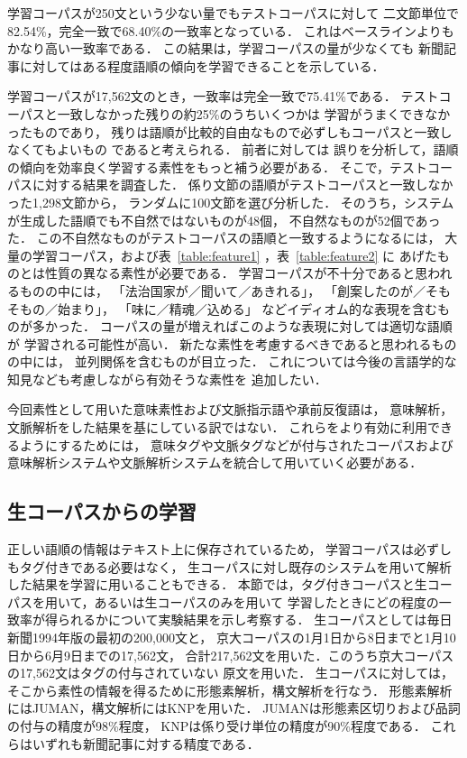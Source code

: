 学習コーパスが250文という少ない量でもテストコーパスに対して
二文節単位で82.54\%，完全一致で68.40\%の一致率となっている．
これはベースラインよりもかなり高い一致率である．
この結果は，学習コーパスの量が少なくても
新聞記事に対してはある程度語順の傾向を学習できることを示している．

学習コーパスが17,562文のとき，一致率は完全一致で75.41\%である．
テストコーパスと一致しなかった残りの約25\%のうちいくつかは
学習がうまくできなかったものであり，
残りは語順が比較的自由なもので必ずしもコーパスと一致しなくてもよいもの
であると考えられる．
前者に対しては
誤りを分析して，語順の傾向を効率良く学習する素性をもっと補う必要がある．
そこで，テストコーパスに対する結果を調査した．
係り文節の語順がテストコーパスと一致しなかった1,298文節から，
ランダムに100文節を選び分析した．
そのうち，システムが生成した語順でも不自然ではないものが48個，
不自然なものが52個であった．
この不自然なものがテストコーパスの語順と一致するようになるには，
大量の学習コーパス，および表~\ref{table:feature1} ，表~\ref{table:feature2} に
あげたものとは性質の異なる素性が必要である．
学習コーパスが不十分であると思われるものの中には，
「法治国家が／聞いて／あきれる」，
「創案したのが／そもそもの／始まり」，
「味に／精魂／込める」
などイディオム的な表現を含むものが多かった．
コーパスの量が増えればこのような表現に対しては適切な語順が
学習される可能性が高い．
新たな素性を考慮するべきであると思われるものの中には，
並列関係を含むものが目立った．
これについては今後の言語学的な知見なども考慮しながら有効そうな素性を
追加したい．

今回素性として用いた意味素性および文脈指示語や承前反復語は，
意味解析，文脈解析をした結果を基にしている訳ではない．
これらをより有効に利用できるようにするためには，
意味タグや文脈タグなどが付与されたコーパスおよび
意味解析システムや文脈解析システムを統合して用いていく必要がある．

\subsection{生コーパスからの学習}
\label{sec:raw_corpus}

正しい語順の情報はテキスト上に保存されているため，
学習コーパスは必ずしもタグ付きである必要はなく，
生コーパスに対し既存のシステムを用いて解析した結果を学習に用いることもできる．
本節では，タグ付きコーパスと生コーパスを用いて，あるいは生コーパスのみを用いて
学習したときにどの程度の一致率が得られるかについて実験結果を示し考察する．
生コーパスとしては毎日新聞1994年版の最初の200,000文と，
京大コーパスの1月1日から8日までと1月10日から6月9日までの17,562文，
合計217,562文を用いた．このうち京大コーパスの17,562文はタグの付与されていない
原文を用いた．
生コーパスに対しては，
そこから素性の情報を得るために形態素解析，構文解析を行なう．
形態素解析にはJUMAN，構文解析にはKNP\cite{KNP2.0b6}を用いた．
JUMANは形態素区切りおよび品詞の付与の精度が98\%程度，
KNPは係り受け単位の精度が90\%程度である．
これらはいずれも新聞記事に対する精度である．

